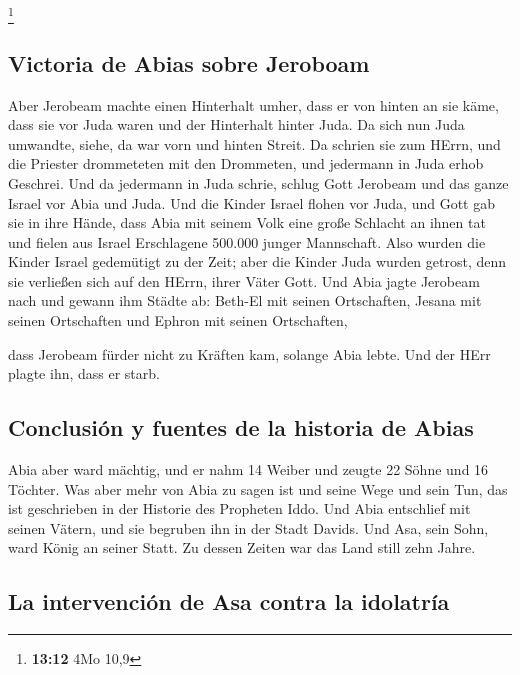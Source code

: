 \footnote{\textbf{13:12} 4Mo 10,9}

\hypertarget{victoria-de-abias-sobre-jeroboam}{%
\subsection{Victoria de Abias sobre
Jeroboam}\label{victoria-de-abias-sobre-jeroboam}}

 Aber Jerobeam machte einen Hinterhalt umher, dass er von
hinten an sie käme, dass sie vor Juda waren und der Hinterhalt hinter
Juda.  Da sich nun Juda umwandte, siehe, da war vorn und
hinten Streit. Da schrien sie zum HErrn, und die Priester drommeteten
mit den Drommeten,  und jedermann in Juda erhob Geschrei.
Und da jedermann in Juda schrie, schlug Gott Jerobeam und das ganze
Israel vor Abia und Juda.  Und die Kinder Israel flohen
vor Juda, und Gott gab sie in ihre Hände,  dass Abia mit
seinem Volk eine große Schlacht an ihnen tat und fielen aus Israel
Erschlagene 500.000 junger Mannschaft.  Also wurden die
Kinder Israel gedemütigt zu der Zeit; aber die Kinder Juda wurden
getrost, denn sie verließen sich auf den HErrn, ihrer Väter Gott.
 Und Abia jagte Jerobeam nach und gewann ihm Städte ab:
Beth-El mit seinen Ortschaften, Jesana mit seinen Ortschaften und Ephron
mit seinen Ortschaften,

 dass Jerobeam fürder nicht zu Kräften kam, solange Abia
lebte. Und der HErr plagte ihn, dass er starb.

\hypertarget{conclusiuxf3n-y-fuentes-de-la-historia-de-abias}{%
\subsection{Conclusión y fuentes de la historia de
Abias}\label{conclusiuxf3n-y-fuentes-de-la-historia-de-abias}}

 Abia aber ward mächtig, und er nahm 14 Weiber und zeugte
22 Söhne und 16 Töchter.  Was aber mehr von Abia zu sagen
ist und seine Wege und sein Tun, das ist geschrieben in der Historie des
Propheten Iddo.  Und Abia entschlief mit seinen Vätern,
und sie begruben ihn in der Stadt Davids. Und Asa, sein Sohn, ward König
an seiner Statt. Zu dessen Zeiten war das Land still zehn Jahre.

\hypertarget{la-intervenciuxf3n-de-asa-contra-la-idolatruxeda}{%
\subsection{La intervención de Asa contra la
idolatría}\label{la-intervenciuxf3n-de-asa-contra-la-idolatruxeda}}

